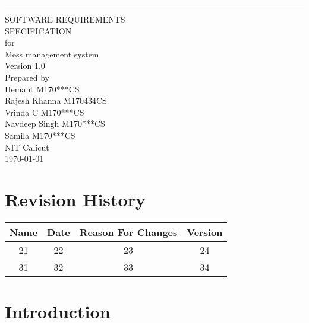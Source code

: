 \documentclass{scrreprt}
\date{}
\def\myversion{1.0 }
\begin{document}
\begin{flushright}
    \rule{16cm}{5pt}\vskip1cm
    \begin{bfseries}
        \Huge{SOFTWARE REQUIREMENTS\\ SPECIFICATION}\\
        \vspace{1.9cm}
        for\\
     Mess management system\\
       
        \LARGE{Version \myversion }\\
        \vspace{1.9cm}
        Prepared by\\ Hemant M170***CS\\
                    Rajesh Khanna M170434CS\\
                    Vrinda C M170***CS\\
                    Navdeep Singh M170***CS\\
                    Samila M170***CS\\
        \vspace{1.9cm}
        NIT Calicut\\
        \vspace{1.9cm}
        \today\\
    \end{bfseries}
\end{flushright}

\tableofcontents


\chapter*{Revision History}

\begin{center}
    \begin{tabular}{|c|c|c|c|}
        \hline
	    Name & Date & Reason For Changes & Version\\
        \hline
	    21 & 22 & 23 & 24\\
        \hline
	    31 & 32 & 33 & 34\\
        \hline
    \end{tabular}
\end{center}

\chapter{Introduction}
\end{document}
